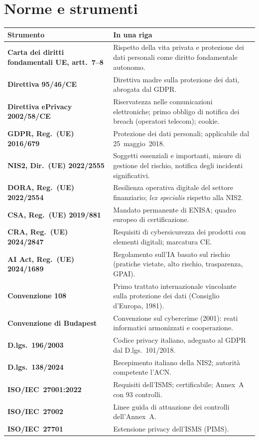 \section{Norme e strumenti}
\begin{longtable}{>{\bfseries}p{}p{}}
\toprule
\normalfont\textbf{Strumento} & \textbf{In una riga} \\
\midrule
\endhead
Carta dei diritti fondamentali UE, artt.~7--8 & Rispetto della vita privata e protezione dei dati
  personali come diritto fondamentale autonomo. \\
Direttiva 95/46/CE & Direttiva madre sulla protezione dei dati, abrogata dal GDPR. \\
Direttiva ePrivacy 2002/58/CE & Riservatezza nelle comunicazioni elettroniche; primo obbligo di
  notifica dei breach (operatori telecom); cookie. \\
GDPR, Reg.~(UE) 2016/679 & Protezione dei dati personali; applicabile dal 25~maggio~2018. \\
NIS2, Dir.~(UE) 2022/2555 & Soggetti essenziali e importanti, misure di gestione del rischio,
  notifica degli incidenti significativi. \\
DORA, Reg.~(UE) 2022/2554 & Resilienza operativa digitale del settore finanziario; \emph{lex
  specialis} rispetto alla NIS2. \\
CSA, Reg.~(UE) 2019/881 & Mandato permanente di ENISA; quadro europeo di certificazione. \\
CRA, Reg.~(UE) 2024/2847 & Requisiti di cybersicurezza dei prodotti con elementi digitali;
  marcatura CE. \\
AI Act, Reg.~(UE) 2024/1689 & Regolamento sull'IA basato sul rischio (pratiche vietate, alto
  rischio, trasparenza, GPAI). \\
Convenzione 108 & Primo trattato internazionale vincolante sulla protezione dei dati (Consiglio
  d'Europa, 1981). \\
Convenzione di Budapest & Convenzione sul cybercrime (2001): reati informatici armonizzati e
  cooperazione. \\
D.lgs.~196/2003 & Codice privacy italiano, adeguato al GDPR dal D.lgs.~101/2018. \\
D.lgs.~138/2024 & Recepimento italiano della NIS2; autorità competente l'ACN. \\
ISO/IEC~27001:2022 & Requisiti dell'ISMS; certificabile; Annex~A con 93 controlli. \\
ISO/IEC~27002 & Linee guida di attuazione dei controlli dell'Annex~A. \\
ISO/IEC~27701 & Estensione privacy dell'ISMS (PIMS). \\
\bottomrule
\end{longtable}

